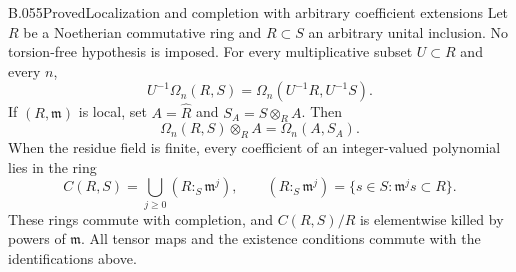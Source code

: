 \begin{saresult}{B.055}{Proved}{Localization and completion with arbitrary coefficient extensions}
Let $R$ be a Noetherian commutative ring and $R\subset S$
an arbitrary unital inclusion. No torsion-free hypothesis is imposed.
For every multiplicative subset $U\subset R$ and every $n$,
\[
 U^{-1}\Omega_n(R,S)
       =\Omega_n(U^{-1}R,U^{-1}S).                         \tag{B55.1}
\]
If $(R,\mathfrak m)$ is local, set $A=\widehat R$ and
$S_A=S\otimes_R A$. Then
\[
 \Omega_n(R,S)\otimes_R A=\Omega_n(A,S_A).                \tag{B55.2}
\]
When the residue field is finite, every coefficient of an
integer-valued polynomial lies in the ring
\[
 C(R,S)=\bigcup_{j\ge0}(R:_S\mathfrak m^j),\qquad
 (R:_S\mathfrak m^j)=\{s\in S:\mathfrak m^js\subset R\}.
                                                               \tag{B55.3}
\]
These rings commute with completion, and $C(R,S)/R$ is
elementwise killed by powers of $\mathfrak m$.
All tensor maps and the existence conditions commute with
the identifications above.
\end{saresult}
